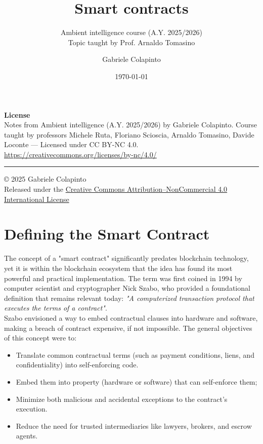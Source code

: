 \documentclass{scrbook}
\title{Smart contracts}
\subtitle{Ambient intelligence course (A.Y. 2025/2026)\\Topic taught by Prof. Arnaldo Tomasino}
\author{Gabriele Colapinto}
\date{\today}
\begin{document}
\maketitle
\thispagestyle{empty}

{\Large\textbf{License}} \\
{Notes from Ambient intelligence (A.Y. 2025/2026) by Gabriele Colapinto. 
Course taught by professors Michele Ruta, Floriano Scioscia, Arnaldo Tomasino, Davide Loconte — 
Licensed under CC BY-NC 4.0.\\
\url{https://creativecommons.org/licenses/by-nc/4.0/}}

\vspace*{\fill}
\rule{\textwidth}{0.2pt}
\small{© 2025 Gabriele Colapinto \\
Released under the \href{https://creativecommons.org/licenses/by-nc/4.0/}{Creative Commons Attribution–NonCommercial 4.0 International License}}

\clearpage

\tableofcontents

\chapter{Defining the Smart Contract}

The concept of a "smart contract" significantly predates blockchain technology, yet it is within the blockchain ecosystem that the idea has found its most powerful and practical implementation. The term was first coined in 1994 by computer scientist and cryptographer Nick Szabo, who provided a foundational definition that remains relevant today: \textit{"A computerized transaction protocol that executes the terms of a contract"}.\\

Szabo envisioned a way to embed contractual clauses into hardware and software, making a breach of contract expensive, if not impossible. The general objectives of this concept were to:

\begin{itemize}
    \item Translate common contractual terms (such as payment conditions, liens, and confidentiality) into self-enforcing code.
    \item Embed them into property (hardware or software) that can self-enforce them;
    \item Minimize both malicious and accidental exceptions to the contract's execution.
    \item Reduce the need for trusted intermediaries like lawyers, brokers, and escrow agents.
\end{itemize}
\end{document}
